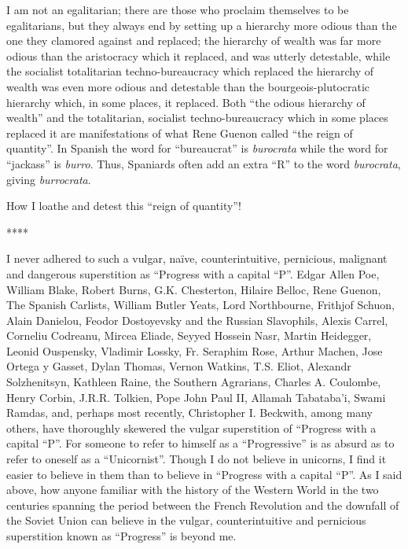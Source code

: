 I am not an egalitarian; there are those who proclaim themselves to be egalitarians, but they always end by setting up a hierarchy more odious than the one they clamored against and replaced; the hierarchy of wealth was far more odious than the aristocracy which it replaced, and was utterly detestable, while the socialist totalitarian techno-bureaucracy which replaced the hierarchy of wealth was even more odious and detestable than the bourgeois-plutocratic hierarchy which, in some places, it replaced. Both ``the odious hierarchy of wealth'' and the totalitarian, socialist techno-bureaucracy which in some places replaced it are manifestations of what Rene Guenon called ``the reign of quantity''. In Spanish the word for ``bureaucrat'' is \emph{burocrata} while the word for ``jackass'' is \emph{burro}. Thus, Spaniards often add an extra ``R'' to the word \emph{burocrata}, giving \emph{burrocrata}.


How I loathe and detest this ``reign of quantity''!

\begin{center} **** \end{center}

I never adhered to such a vulgar, naïve, counterintuitive, pernicious, malignant and dangerous superstition as ``Progress with a capital ``P''. Edgar Allen Poe, William Blake, Robert Burns, G.K. Chesterton, Hilaire Belloc, Rene Guenon, The Spanish Carlists, William Butler Yeats, Lord Northbourne, Frithjof Schuon, Alain Danielou, Feodor Dostoyevsky and the Russian Slavophils, Alexis Carrel, Corneliu Codreanu, Mircea Eliade, Seyyed Hossein Nasr, Martin Heidegger, Leonid Ouspensky, Vladimir Lossky, Fr. Seraphim Rose, Arthur Machen, Jose Ortega y Gasset, Dylan Thomas, Vernon Watkins, T.S. Eliot, Alexandr Solzhenitsyn, Kathleen Raine, the Southern Agrarians, Charles A. Coulombe, Henry Corbin, J.R.R. Tolkien, Pope John Paul II, Allamah Tabataba'i, Swami Ramdas, and, perhaps most recently, Christopher I. Beckwith, among many others, have thoroughly skewered the vulgar superstition of ``Progress with a capital ``P''. For someone to refer to himself as a ``Progressive'' is as absurd as to refer to oneself as a ``Unicornist''. Though I do not believe in unicorns, I find it easier to believe in them than to believe in ``Progress with a capital ``P''. As I said above, how anyone familiar with the history of the Western World in the two centuries spanning the period between the French Revolution and the downfall of the Soviet Union can believe in the vulgar, counterintuitive and pernicious superstition known as ``Progress'' is beyond me.

